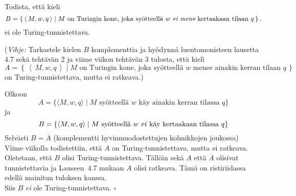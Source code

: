 \documentclass[12pt,a4paper]{article}
\newcommand{\set}[1]{\left\{\,#1\,\right\}}
\newcommand{\code}[1]{\left\langle\,#1\,\right\rangle}
\begin{document}
\pagebreak
{}
  Todista, että kieli
\[B=\set{\code{M,w,q}\mid
\mbox{$M$ on Turingin kone, joka syötteellä $w$ {\it ei mene} kertaakaan
tilaan $q$}}.\]
ei ole Turing-tunnistettava.

({\em Vihje:} Tarkastele kielen $B$ komplementtia ja hyödynnä luentomonisteen lausetta 4.7 sekä tehtävän 2 ja viime viikon tehtävän 3 tulosta, että kieli
\[
A=\set{\code{M,w,q}\mid
\mbox{$M$ on Turingin kone, joka syötteellä $w$ menee ainakin kerran
  tilaan $q$}}
\]
on Turing-tunnistettava, mutta ei ratkeava.)

\bigskip

Olkoon
\[
A=\{\langle M,w,q\rangle \mid \text{$M$ syötteellä $w$ käy ainakin kerran tilassa $q$}\}
\]
ja
\[
B=\{\langle M,w,q\rangle \mid \text{$M$ syötteellä $w$ \emph{ei} käy kertaakaan tilassa $q$}\}
\]
Selvästi $B=\overline{A}$ (komplementti hyvinmuodostettujen kolmikkojen joukossa)\\


Viime viikolla todistettiin, että $A$ on Turing-tunnistettava, mutta ei ratkeava.
Oletetaan, että $B$ olisi Turing-tunnistettava. Tällöin sekä $A$ että
$\overline{A}$ olisivat tunnistettavia ja Lauseen~4.7
mukaan $A$ olisi ratkeava. Tämä on ristiriidassa edellä mainitun tuloksen kanssa.\\

Siis $B$ \emph{ei} ole Turing-tunnistettava. \(\square\)
\end{document}
